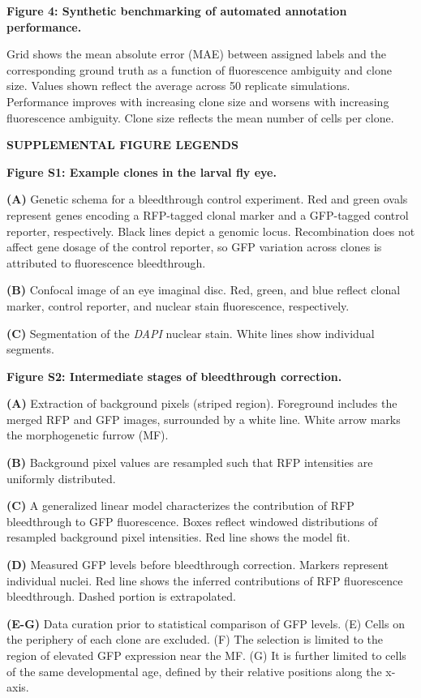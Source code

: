 \textbf{Figure 4: Synthetic benchmarking of automated annotation performance. }

Grid shows the mean absolute error (MAE) between assigned labels and the corresponding ground truth as a function of fluorescence ambiguity and clone size. Values shown reflect the average across 50 replicate simulations. Performance improves with increasing clone size and worsens with increasing fluorescence ambiguity. Clone size reflects the mean number of cells per clone.

\textbf{SUPPLEMENTAL FIGURE LEGENDS}

\textbf{Figure S1: Example clones in the larval fly eye.}

\textbf{(A)} Genetic schema for a bleedthrough control experiment. Red and green ovals represent genes encoding a RFP-tagged clonal marker and a GFP-tagged control reporter, respectively. Black lines depict a genomic locus. Recombination does not affect gene dosage of the control reporter, so GFP variation across clones is attributed to fluorescence bleedthrough.

\textbf{(B)} Confocal image of an eye imaginal disc. Red, green, and blue reflect clonal marker, control reporter, and nuclear stain fluorescence, respectively.

\textbf{(C)} Segmentation of the \emph{DAPI} nuclear stain. White lines show individual segments.

\textbf{Figure S2: Intermediate stages of bleedthrough correction.}

\textbf{(A)} Extraction of background pixels (striped region). Foreground includes the merged RFP and GFP images, surrounded by a white line. White arrow marks the morphogenetic furrow (MF).

\textbf{(B)} Background pixel values are resampled such that RFP intensities are uniformly distributed.

\textbf{(C)} A generalized linear model characterizes the contribution of RFP bleedthrough to GFP fluorescence. Boxes reflect windowed distributions of resampled background pixel intensities. Red line shows the model fit.

\textbf{(D)} Measured GFP levels before bleedthrough correction. Markers represent individual nuclei. Red line shows the inferred contributions of RFP fluorescence bleedthrough. Dashed portion is extrapolated.

\textbf{(E-G)} Data curation prior to statistical comparison of GFP levels. (E) Cells on the periphery of each clone are excluded. (F) The selection is limited to the region of elevated GFP expression near the MF. (G) It is further limited to cells of the same developmental age, defined by their relative positions along the x-axis.

